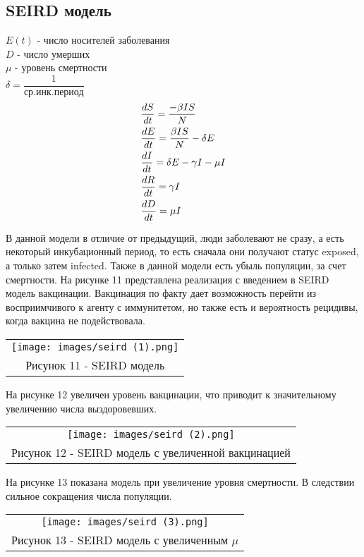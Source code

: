 \subsection{SEIRD модель}
$E(t)$ - число носителей заболевания\\
$D$ - число умерших\\
$\mu$ - уровень смертности\\
$\delta=\dfrac{1}{\text{ср.инк.период}}$
\begin{align}
  &\dfrac{d S}{dt}=\dfrac{-\beta IS}{N}\notag\\
  &\dfrac{d E}{dt}=\dfrac{\beta IS}{N}-\delta E\notag\\
  &\dfrac{d I}{dt}=\delta E-\gamma I-\mu I\\
  &\dfrac{d R}{dt}=\gamma I\notag\\
  &\dfrac{d D}{dt}=\mu I\notag
\end{align}

В данной модели в отличие от предыдущий, люди заболевают не сразу, а есть некоторый инкубационный период, то есть сначала они получают статус exposed, а только затем infected. Также в данной модели есть убыль популяции, за счет смертности. На рисунке 11 представлена реализация с введением в SEIRD модель вакцинации. Вакцинация по факту дает возможность перейти из восприимчивого к агенту с иммунитетом, но также есть и вероятность рецидивы, когда вакцина не подействовала.
\begin{center}
  \begin{tabular}{c}
    \texttt{[image: images/seird (1).png]}\\
    Рисунок 11 - SEIRD модель
  \end{tabular}
\end{center}

На рисунке 12 увеличен уровень вакцинации, что приводит к значительному увеличению числа выздоровевших.
\begin{center}
  \begin{tabular}{c}
    \texttt{[image: images/seird (2).png]}\\
    Рисунок 12 - SEIRD модель с увеличенной вакцинацией
  \end{tabular}
\end{center}

На рисунке 13 показана модель при увеличение уровня смертности. В следствии сильное сокращения числа популяции.
\begin{center}
  \begin{tabular}{c}
    \texttt{[image: images/seird (3).png]}\\
    Рисунок 13 - SEIRD модель с увеличенным $\mu$
  \end{tabular}
\end{center}

